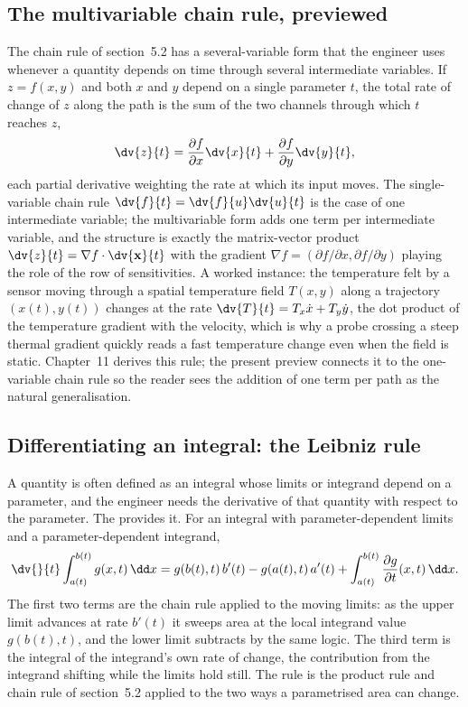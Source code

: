 \subsection{The multivariable chain rule, previewed}

The chain rule of section~5.2 has a several-variable form that the
engineer uses whenever a quantity depends on time through several
intermediate variables. If $z = f(x, y)$ and both $x$ and $y$ depend on
a single parameter $t$, the total rate of change of $z$ along the path is
the sum of the two channels through which $t$ reaches $z$,
\[
\dv{z}{t} = \frac{\partial f}{\partial x}\dv{x}{t} +
\frac{\partial f}{\partial y}\dv{y}{t},
\]
each partial derivative weighting the rate at which its input moves. The
single-variable chain rule $\dv{f}{t} = \dv{f}{u}\dv{u}{t}$ is the case
of one intermediate variable; the multivariable form adds one term per
intermediate variable, and the structure is exactly the matrix-vector
product $\dv{z}{t} = \nabla f \cdot \dv{\mathbf{x}}{t}$ with the gradient
$\nabla f = (\partial f/\partial x, \partial f/\partial y)$ playing the
role of the row of sensitivities. A worked instance: the temperature
felt by a sensor moving through a spatial temperature field $T(x, y)$
along a trajectory $(x(t), y(t))$ changes at the rate $\dv{T}{t} =
T_{x}\dot{x} + T_{y}\dot{y}$, the dot product of the temperature gradient
with the velocity, which is why a probe crossing a steep thermal gradient
quickly reads a fast temperature change even when the field is static.
Chapter~11 derives this rule; the present preview connects it to the
one-variable chain rule so the reader sees the addition of one term per
path as the natural generalisation.

\subsection{Differentiating an integral: the Leibniz rule}

A quantity is often defined as an integral whose limits or integrand
depend on a parameter, and the engineer needs the derivative of that
quantity with respect to the parameter. The  provides it. For an integral with parameter-dependent limits and a
parameter-dependent integrand,
\[
\dv{}{t}\int_{a(t)}^{b(t)} g(x, t)\,\dd x =
g(b(t), t)\,b'(t) - g(a(t), t)\,a'(t) +
\int_{a(t)}^{b(t)}\frac{\partial g}{\partial t}(x, t)\,\dd x.
\]
The first two terms are the chain rule applied to the moving limits: as
the upper limit advances at rate $b'(t)$ it sweeps area at the local
integrand value $g(b(t), t)$, and the lower limit subtracts by the same
logic. The third term is the integral of the integrand's own rate of
change, the contribution from the integrand shifting while the limits
hold still. The rule is the product rule and chain rule of section~5.2
applied to the two ways a parametrised area can change.


